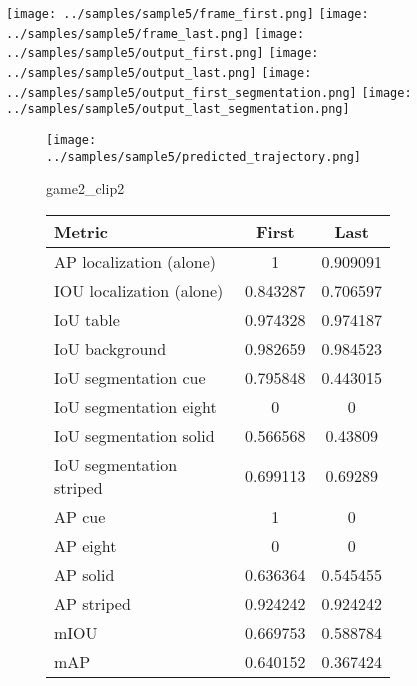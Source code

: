 \begin{figure}
    \texttt{[image: ../samples/sample5/frame\_first.png]}
    \texttt{[image: ../samples/sample5/frame\_last.png]}
    \newline
    \texttt{[image: ../samples/sample5/output\_first.png]}
    \texttt{[image: ../samples/sample5/output\_last.png]}
    \newline
    \texttt{[image: ../samples/sample5/output\_first\_segmentation.png]}
    \texttt{[image: ../samples/sample5/output\_last\_segmentation.png]}
    \newline
    \begin{subfigure}[b]{0.49\textwidth}
        \vspace{20pt}
        \texttt{[image: ../samples/sample5/predicted\_trajectory.png]}
        \caption*{game2\_clip2}
    \end{subfigure}
\begin{subfigure}[b]{0.49\textwidth}
    \begin{tabular}{|l|c|c|}
        \hline
        \textbf{Metric} & \textbf{First} & \textbf{Last} \\
        \hline
        AP localization (alone) & 1 & 0.909091 \\ 
        IOU localization (alone) & 0.843287 & 0.706597 \\ 
        \hline
        IoU table & 0.974328 & 0.974187 \\ 
        IoU background & 0.982659 & 0.984523 \\ 
        \hline
        IoU segmentation cue & 0.795848 & 0.443015 \\ 
        IoU segmentation eight & 0 & 0 \\ 
        IoU segmentation solid & 0.566568 & 0.43809 \\ 
        IoU segmentation striped & 0.699113 & 0.69289 \\ 
        \hline
        AP cue & 1 & 0 \\ 
        AP eight & 0 & 0 \\ 
        AP solid & 0.636364 & 0.545455 \\ 
        AP striped & 0.924242 & 0.924242 \\ 
        \hline
        mIOU & 0.669753 & 0.588784 \\ 
        mAP & 0.640152 & 0.367424 \\ 
        \hline
    \end{tabular}    
\end{subfigure}
\end{figure}

